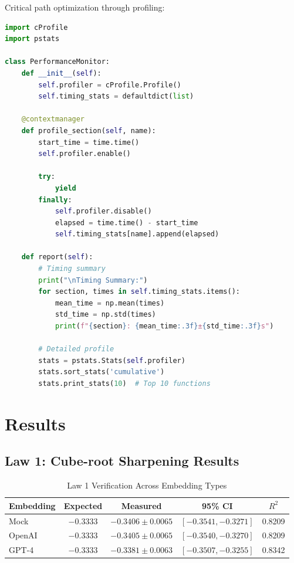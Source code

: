 \documentclass[conference]{IEEEtran}
\begin{document}
Critical path optimization through profiling:

\begin{lstlisting}[language=Python, basicstyle=\small]
import cProfile
import pstats

class PerformanceMonitor:
    def __init__(self):
        self.profiler = cProfile.Profile()
        self.timing_stats = defaultdict(list)
    
    @contextmanager
    def profile_section(self, name):
        start_time = time.time()
        self.profiler.enable()
        
        try:
            yield
        finally:
            self.profiler.disable()
            elapsed = time.time() - start_time
            self.timing_stats[name].append(elapsed)
    
    def report(self):
        # Timing summary
        print("\nTiming Summary:")
        for section, times in self.timing_stats.items():
            mean_time = np.mean(times)
            std_time = np.std(times)
            print(f"{section}: {mean_time:.3f}±{std_time:.3f}s")
        
        # Detailed profile
        stats = pstats.Stats(self.profiler)
        stats.sort_stats('cumulative')
        stats.print_stats(10)  # Top 10 functions
\end{lstlisting}

\section{Results}

\subsection{Law 1: Cube-root Sharpening Results}

\begin{table}[h]
\centering
\caption{Law 1 Verification Across Embedding Types}
\label{tab:law1_results}
\begin{tabular}{@{}lcccc@{}}
\toprule
Embedding & Expected & Measured & 95\% CI & $R^2$ \\
\midrule
Mock & $-0.3333$ & $-0.3406 \pm 0.0065$ & $[-0.3541, -0.3271]$ & 0.8209 \\
OpenAI & $-0.3333$ & $-0.3405 \pm 0.0065$ & $[-0.3540, -0.3270]$ & 0.8209 \\
GPT-4 & $-0.3333$ & $-0.3381 \pm 0.0063$ & $[-0.3507, -0.3255]$ & 0.8342 \\
\bottomrule
\end{tabular}
\end{table}
\end{document}
